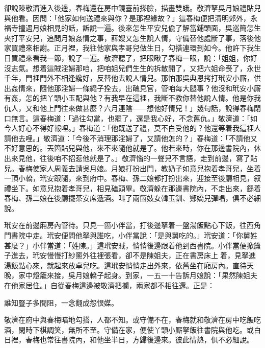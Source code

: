 卻說陳敬濟進入後邊，春梅還在房中鏡臺前搽臉，描畫雙蛾。敬濟拏吳月娘禮貼兒與他看。因問：「他家如何送禮來與你？是那裡緣故？」這春梅便把清明郊外，永福寺撞遇月娘相見的話，訴說一遍。後來怎生平安兒偸了解當鋪頭面，吳巡簡怎生夾打平安兒，追問月娘姦情之事，薛嫂又怎生說人情，守備替他處斷了事，落後他家買禮來相謝。正月裡，我往他家與孝哥兒做生日，勾搭連環到如今。他許下我生日買禮來看我一節，說了一遍。敬濟聽了，把眼瞅了春梅一眼，說：「姐姐，你好沒志氣。想着這賊淫婦那咱，把咱姐兒們生生的拆散開了，又把六姐命䘮了，永世千年，門裡門外不相逢纔好，反替他去說人情兒。那怕那吳典恩拷打玳安小厮，供出姦情來，隨他那淫婦一條繩子拴去，出醜見官，管咱每大腿事？他沒和玳安小厮有姦，怎的把丫頭小玉配與他？{}有我早在這裡，我斷不教你替他說人情。他是你我仇人，又和他上門往來做甚麼？六月連陰——想他好情兒！」{}幾句話，說得春梅閉口無言。這春梅道：「過往勾當，也罷了，還是我心好，不念舊仇。」敬濟道：「如今人好心不得好報哩。」春梅道：「他既送了禮，莫不白受他的？他還等着我這裡人請他去哩。」敬濟道：「今後不消理那淫婦了，又請他怎的？」春梅道：「不請他又不好意思的。丟箇貼兒與他，來不來隨他就是了。他若來時，你在那邊書院內，休出來見他，往後咱不招惹他就是了。」敬濟惱的一聲兒不言語，走到前邊，寫了貼兒。春梅使家人周義去請吳月娘。月娘打扮出門，教奶子如意兒抱着孝哥兒，坐着一頂小轎，玳安跟隨，來到府中。春梅、孫二娘都打扮出來，迎接至後廳相見，叙禮坐下。如意兒抱着孝哥兒，相見磕頭畢。敬濟躲在那邊書院內，不走出來，繇着春梅、孫二娘在後廳擺茶安席遞酒。叫了兩箇妓女韓玉釧、鄭嬌兒彈唱，俱不必細說。

玳安在前邊廂房內管待。只見一箇小伴當，打後邊拏着一盤湯飯點心下飯，往西角門書院中走。玳安便問他拏與誰吃，小伴當說：「是與舅吃的。」玳安道：「你舅姓甚麼？」小伴當道：「姓陳。」這玳安賊，悄悄後邊跟着他到西書院。小伴當便掀簾子進去，玳安慢慢打紗窻外往裡張看，卻不是陳姐夫，正在書房床上𢱉着，見拏進湯飯點心來，就起來放卓兒吃。這玳安悄悄走出外來，依舊坐在廂房內。直待天晚，家中燈籠來接，吳月娘轎子起身。到家，一五一十告訴月娘說：「果然陳姐夫在他家居住。」自從春梅這邊被敬濟把攔，兩家都不相往還。正是：

\begin{myquote}
誰知豎子多間阻，一念翻成怨恨媒。
\end{myquote}

敬濟在府中與春梅暗地勾搭，人都不知。或守備不在，春梅就和敬濟在房中吃飯吃酒，閑時下棋調笑，無所不至。守備在家，便使丫頭小厮拏飯往書院與他吃。或白日裡，春梅也常往書院內，和他坐半日，方歸後邊來。彼此情熱，俱不必細說。

